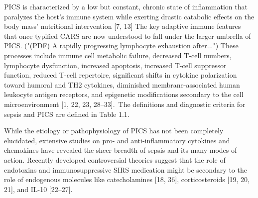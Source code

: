PICS is characterized by a low but constant, chronic state of
inflammation that paralyzes the host's immune system while exerting
drastic catabolic effects on the body mass' nutritional intervention {[}7, 13{]}
The key adaptive immune features that once typified CARS are now
understood to fall under the larger umbrella of PICS. ("(PDF) A rapidly
progressing lymphocyte exhaustion after...") These processes include
immune cell metabolic failure, decreased T-cell numbers, lymphocyte
dysfunction, increased apoptosis, increased T-cell suppressor function,
reduced T-cell repertoire, significant shifts in cytokine polarization
toward humoral and TH2 cytokines, diminished membrane-associated human
leukocyte antigen receptors, and epigenetic modifications secondary to
the cell microenvironment {[}1, 22, 23, 28--33{]}.~The definitions and
diagnostic criteria for sepsis and PICS are defined in Table 1.1.

While the etiology or pathophysiology of PICS has not been completely
elucidated, extensive studies on pro- and anti-inflammatory cytokines
and chemokines have revealed the sheer breadth of sepsis and its many
modes of action. Recently developed controversial theories suggest that
the role of endotoxins and immunosuppressive SIRS medication might be
secondary to the role of endogenous molecules like catecholamines {[}18,
36{]}, corticosteroids {[}19, 20, 21{]}, and IL-10 {[}22--27{]}.

